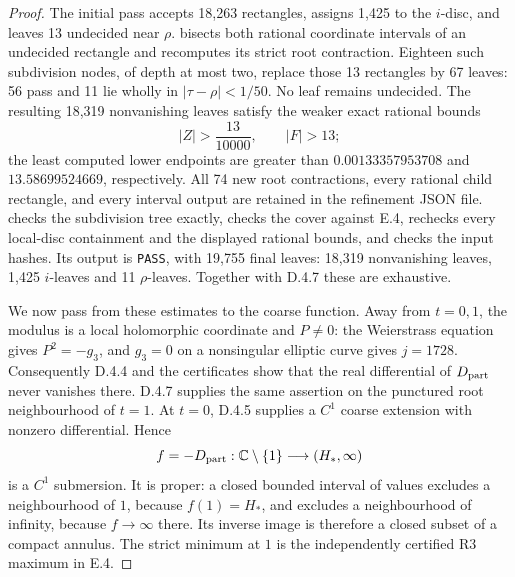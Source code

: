 \begin{proof}
The initial pass accepts 18,263 rectangles, assigns 1,425 to the
\(i\)-disc, and leaves 13 undecided near \(\rho\).
 bisects both rational coordinate
intervals of an undecided rectangle and recomputes its strict root
contraction. Eighteen such subdivision nodes, of depth at most two,
replace those 13 rectangles by 67 leaves: 56 pass and 11 lie wholly
in \(|\tau-\rho|<1/50\). No leaf remains undecided. The resulting
18,319 nonvanishing leaves satisfy the weaker exact rational bounds
\[
 |Z|>\frac{13}{10000},\qquad |F|>13;
\]
the least computed lower endpoints are greater than
\(0.00133357953708\) and \(13.58699524669\), respectively.
All 74 new root contractions, every rational child rectangle, and
every interval output are retained in the refinement JSON file.
 checks the subdivision tree
exactly, checks the cover against E.4, rechecks every local-disc
containment and the displayed rational bounds, and checks the input
hashes. Its output is \texttt{PASS}, with 19,755 final leaves:
18,319 nonvanishing leaves, 1,425 \(i\)-leaves and 11
\(\rho\)-leaves. Together with D.4.7 these are exhaustive.

We now pass from these estimates to the coarse function. Away from
\(t=0,1\), the modulus is a local holomorphic coordinate and
\(P\ne0\): the Weierstrass equation gives \(P^2=-g_3\), and
\(g_3=0\) on a nonsingular elliptic curve gives \(j=1728\).
Consequently D.4.4 and the certificates show that the real
differential of \(D_{\rm part}\) never vanishes there. D.4.7
supplies the same assertion on the punctured root neighbourhood
of \(t=1\). At \(t=0\), D.4.5 supplies a \(C^1\) coarse
extension with nonzero differential. Hence
\[
 f=-D_{\rm part}:\mathbb C\setminus\{1\}
               \longrightarrow(H_*,\infty)
\]
is a \(C^1\) submersion. It is proper: a closed bounded interval
of values excludes a neighbourhood of \(1\), because
\(f(1)=H_*\), and excludes a neighbourhood of infinity, because
\(f\to\infty\) there. Its inverse image is therefore a closed
subset of a compact annulus. The strict minimum at \(1\) is the
independently certified R3 maximum in E.4.


\end{proof}
